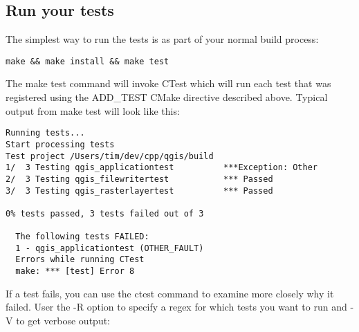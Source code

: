 \hypertarget{toc53}{}
\subsection{Run your tests}
The simplest way to run the tests is as part of your normal build process:

\begin{verbatim}
make && make install && make test
\end{verbatim}

The make test command will invoke CTest which will run each test that was
registered using the ADD\_TEST CMake directive described above. Typical output
from make test will look like this:

\begin{verbatim}
Running tests...
Start processing tests
Test project /Users/tim/dev/cpp/qgis/build
1/  3 Testing qgis_applicationtest          ***Exception: Other
2/  3 Testing qgis_filewritertest           *** Passed
3/  3 Testing qgis_rasterlayertest          *** Passed

0% tests passed, 3 tests failed out of 3

  The following tests FAILED:
  1 - qgis_applicationtest (OTHER_FAULT)
  Errors while running CTest
  make: *** [test] Error 8
\end{verbatim}

If a test fails, you can use the ctest command to examine more closely why it
failed. User the -R option to specify a regex for which tests you want to run
and -V to get verbose output:

